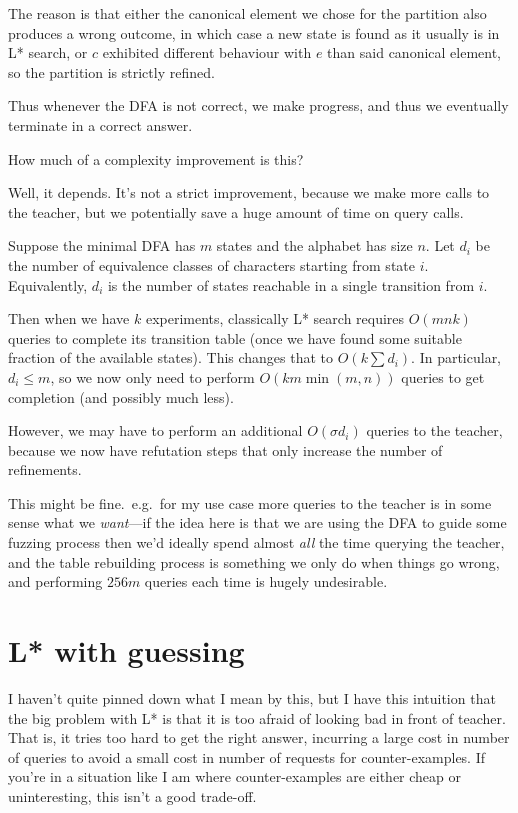 \documentclass[a4paper]{book}
\begin{document}
The reason is that either the canonical element we chose for the partition also produces a wrong outcome,
in which case a new state is found as it usually is in L* search,
or \(c\) exhibited different behaviour with \(e\) than said canonical element,
so the partition is strictly refined.

Thus whenever the DFA is not correct,
we make progress,
and thus we eventually terminate in a correct answer.

How much of a complexity improvement is this?

Well, it depends.
It's not a strict improvement,
because we make more calls to the teacher,
but we potentially save a huge amount of time on query calls.

Suppose the minimal DFA has \(m\) states and the alphabet has size \(n\).
Let \(d_i\) be the number of equivalence classes of characters starting from state \(i\).
Equivalently,
\(d_i\) is the number of states reachable in a single transition from \(i\).

Then when we have \(k\) experiments,
classically L* search requires \(O(mnk)\) queries to complete its transition table (once we have found some suitable fraction of the available states).
This changes that to \(O(k \sum d_i)\).
In particular,
\(d_i \leq m\),
so we now only need to perform \(O(km \min(m, n)) \) queries to get completion (and possibly much less).

However,
we may have to perform an additional \(O(\sigma d_i)\) queries to the teacher,
because we now have refutation steps that only increase the number of refinements.

This might be fine.\
e.g.\ for my use case more queries to the teacher is in some sense what we \emph{want}---if
the idea here is that we are using the DFA to guide some fuzzing process then we'd ideally spend almost \emph{all} the time querying the teacher,
and the table rebuilding process is something we only do when things go wrong,
and performing \(256 m\) queries each time is hugely undesirable.

\section{L* with guessing}

I haven't quite pinned down what I mean by this,
but I have this intuition that the big problem with L* is that it is too afraid of looking bad in front of teacher.
That is,
it tries too hard to get the right answer,
incurring a large cost in number of queries to avoid a small cost in number of requests for counter-examples.
If you're in a situation like I am where counter-examples are either cheap or uninteresting,
this isn't a good trade-off.
\end{document}
